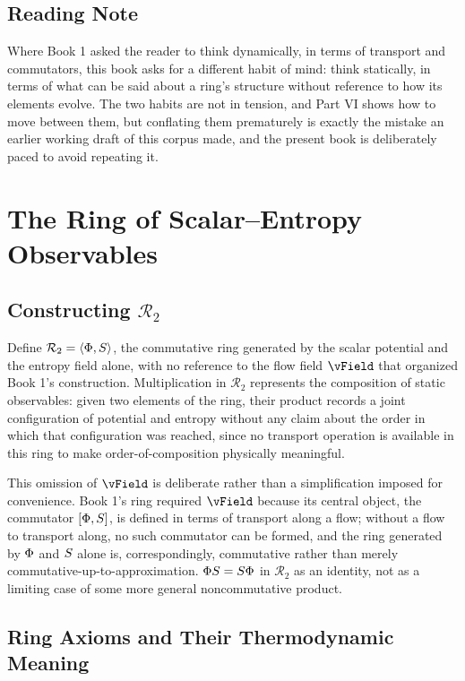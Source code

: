 \chapter*{Reading Note}

Where Book 1 asked the reader to think dynamically, in terms of transport and commutators, this book asks for a different habit of mind: think statically, in terms of what can be said about a ring's structure without reference to how its elements evolve. The two habits are not in tension, and Part VI shows how to move between them, but conflating them prematurely is exactly the mistake an earlier working draft of this corpus made, and the present book is deliberately paced to avoid repeating it.

\part{The Ring of Scalar--Entropy Observables}

\chapter{Constructing $\mathcal{R}_2$}

Define $\mathcal{R}_2 = \langle \Phi, S \rangle$, the commutative ring generated by the scalar potential and the entropy field alone, with no reference to the flow field $\vField$ that organized Book 1's construction. Multiplication in $\mathcal{R}_2$ represents the composition of static observables: given two elements of the ring, their product records a joint configuration of potential and entropy without any claim about the order in which that configuration was reached, since no transport operation is available in this ring to make order-of-composition physically meaningful.

This omission of $\vField$ is deliberate rather than a simplification imposed for convenience. Book 1's ring required $\vField$ because its central object, the commutator $[\Phi, S]$, is defined in terms of transport along a flow; without a flow to transport along, no such commutator can be formed, and the ring generated by $\Phi$ and $S$ alone is, correspondingly, commutative rather than merely commutative-up-to-approximation. $\Phi S = S \Phi$ in $\mathcal{R}_2$ as an identity, not as a limiting case of some more general noncommutative product.

\chapter{Ring Axioms and Their Thermodynamic Meaning}

